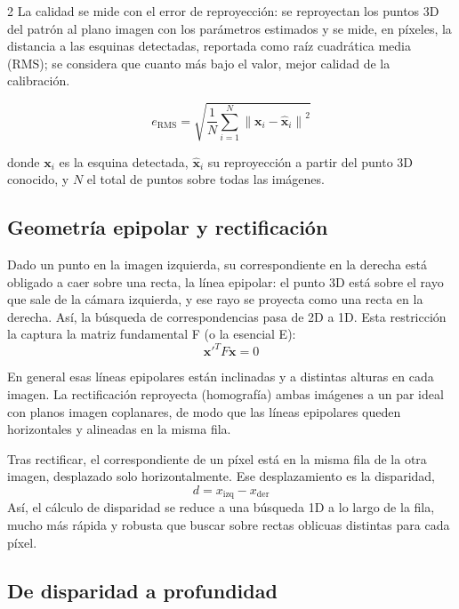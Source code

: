 \documentclass[10pt,a4paper]{article}
\begin{document}
\begin{multicols}{2}
La calidad se mide con el error de reproyección: se reproyectan los puntos 3D del patrón al plano
imagen con los parámetros estimados y se mide, en píxeles, la distancia a las esquinas
detectadas, reportada como raíz cuadrática media (RMS); 
se considera que cuanto más bajo el valor, mejor calidad de la calibración.

\begin{equation}\label{eq:rms}
e_{\text{RMS}} = \sqrt{\frac{1}{N}\sum_{i=1}^{N}\left\lVert \mathbf{x}_i - \hat{\mathbf{x}}_i \right\rVert^2}
\end{equation}

donde $\mathbf{x}_i$ es la esquina detectada, $\hat{\mathbf{x}}_i$ su reproyección a partir del
punto 3D conocido, y $N$ el total de puntos sobre todas las imágenes.

\subsection{Geometría epipolar y rectificación}

Dado un punto en la imagen izquierda, su correspondiente en la derecha está obligado a caer sobre
una recta, la línea epipolar: el punto 3D está sobre el rayo que sale de la cámara izquierda, y
ese rayo se proyecta como una recta en la derecha. Así, la búsqueda de correspondencias pasa de
2D a 1D. Esta restricción la captura la matriz fundamental F (o la esencial E):
\begin{equation}\label{eq:epipolar}
\mathbf{x}'^{T} F \mathbf{x} = 0
\end{equation}

En general esas líneas epipolares están inclinadas y a distintas alturas en cada imagen. La
rectificación reproyecta (homografía) ambas imágenes a un par ideal con planos imagen coplanares,
de modo que las líneas epipolares queden horizontales y alineadas en la misma fila.

Tras rectificar, el correspondiente de un píxel está en la misma fila de la otra imagen, desplazado solo
horizontalmente. Ese desplazamiento es la disparidad,
\begin{equation}\label{eq:disparidad}
d = x_{\text{izq}} - x_{\text{der}}
\end{equation}
Así, el cálculo
de disparidad se reduce a una búsqueda 1D a lo largo de la fila, mucho más rápida y robusta que buscar sobre
rectas oblicuas distintas para cada píxel.

\subsection{De disparidad a profundidad}


\end{multicols}
\end{document}
